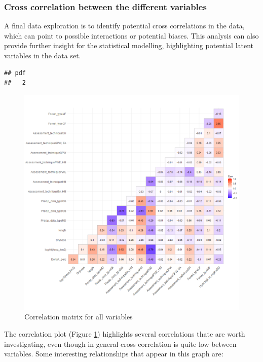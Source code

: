 \documentclass[]{elsarticle} %
\begin{document}
\hypertarget{cross-correlation-between-the-different-variables}{%
\subsubsection{Cross correlation between the different variables}\label{cross-correlation-between-the-different-variables}}

A final data exploration is to identify potential cross correlations in the data, which can point to possible interactions or potential biases. This analysis can also provide further insight for the statistical modelling, highlighting potential latent variables in the data set.

\begin{verbatim}
## pdf 
##   2
\end{verbatim}

\begin{figure}
\includegraphics[width=0.9\linewidth]{variable_corr_plot} \caption{Correlation matrix for all variables}\label{fig:corgraphs}
\end{figure}

The correlation plot (Figure \ref{fig:corgraphs}) highlights several correlations thate are worth investigating, even though in general cross correlation is quite low between variables. Some interesting relationships that appear in this graph are:
\end{document}
